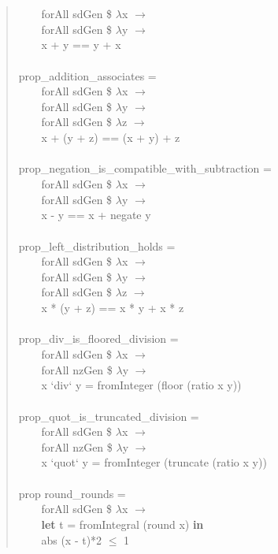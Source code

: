 \documentclass[prodmode,acmtoplas]{acmsmall}
\begin{document}
\begin{quote}
\begin{tabbing}
\verb|    |\sffamily    forAll sdGen \$ $\lambda$x $\rightarrow$\\
\verb|    |\sffamily    forAll sdGen \$ $\lambda$y $\rightarrow$\\
\verb|    |\sffamily    x + y == y + x\\
\\
\sffamily prop\_addition\_associates =\\
\verb|    |\sffamily    forAll sdGen \$ $\lambda$x $\rightarrow$\\
\verb|    |\sffamily    forAll sdGen \$ $\lambda$y $\rightarrow$\\
\verb|    |\sffamily    forAll sdGen \$ $\lambda$z $\rightarrow$\\
\verb|    |\sffamily    x + (y + z) == (x + y) + z\\
\\
\sffamily prop\_negation\_is\_compatible\_with\_subtraction =\\
\verb|    |\sffamily    forAll sdGen \$ $\lambda$x $\rightarrow$\\
\verb|    |\sffamily    forAll sdGen \$ $\lambda$y $\rightarrow$\\
\verb|    |\sffamily    x - y == x + negate y\\
\\
\sffamily prop\_left\_distribution\_holds =\\
\verb|    |\sffamily    forAll sdGen \$ $\lambda$x $\rightarrow$\\
\verb|    |\sffamily    forAll sdGen \$ $\lambda$y $\rightarrow$\\
\verb|    |\sffamily    forAll sdGen \$ $\lambda$z $\rightarrow$\\
\verb|    |\sffamily    x * (y + z) == x * y + x * z\\
\\
\sffamily prop\_div\_is\_floored\_division =\\
\verb|    |\sffamily    forAll sdGen \$ $\lambda$x $\rightarrow$\\
\verb|    |\sffamily    forAll nzGen \$ $\lambda$y $\rightarrow$\\
\verb|    |\sffamily    x `div` y = fromInteger (floor (ratio x y))\\
\\
\sffamily prop\_quot\_is\_truncated\_division =\\
\verb|    |\sffamily    forAll sdGen \$ $\lambda$x $\rightarrow$\\
\verb|    |\sffamily    forAll nzGen \$ $\lambda$y $\rightarrow$\\
\verb|    |\sffamily    x `quot` y = fromInteger (truncate (ratio x y))\\
\\
\sffamily prop round\_rounds =\\
\verb|    |\sffamily    forAll sdGen \$ $\lambda$x $\rightarrow$\\
\verb|    |\sffamily    \textbf{let} t = fromIntegral (round x) \textbf{in}\\
\verb|    |\sffamily    abs (x - t)*2 $\le$ 1
\end{tabbing}
\end{quote}
\end{document}

